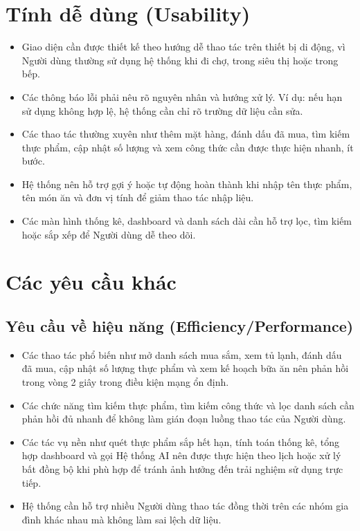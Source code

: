 \section{Tính dễ dùng (Usability)}
\begin{itemize}
    \item Giao diện cần được thiết kế theo hướng dễ thao tác trên thiết bị di động, vì Người dùng thường sử dụng hệ thống khi đi chợ, trong siêu thị hoặc trong bếp.
    \item Các thông báo lỗi phải nêu rõ nguyên nhân và hướng xử lý. Ví dụ: nếu hạn sử dụng không hợp lệ, hệ thống cần chỉ rõ trường dữ liệu cần sửa.
    \item Các thao tác thường xuyên như thêm mặt hàng, đánh dấu đã mua, tìm kiếm thực phẩm, cập nhật số lượng và xem công thức cần được thực hiện nhanh, ít bước.
    \item Hệ thống nên hỗ trợ gợi ý hoặc tự động hoàn thành khi nhập tên thực phẩm, tên món ăn và đơn vị tính để giảm thao tác nhập liệu.
    \item Các màn hình thống kê, dashboard và danh sách dài cần hỗ trợ lọc, tìm kiếm hoặc sắp xếp để Người dùng dễ theo dõi.
\end{itemize}

\section{Các yêu cầu khác}

\subsection{Yêu cầu về hiệu năng (Efficiency/Performance)}
\begin{itemize}
    \item Các thao tác phổ biến như mở danh sách mua sắm, xem tủ lạnh, đánh dấu đã mua, cập nhật số lượng thực phẩm và xem kế hoạch bữa ăn nên phản hồi trong vòng 2 giây trong điều kiện mạng ổn định.
    \item Các chức năng tìm kiếm thực phẩm, tìm kiếm công thức và lọc danh sách cần phản hồi đủ nhanh để không làm gián đoạn luồng thao tác của Người dùng.
    \item Các tác vụ nền như quét thực phẩm sắp hết hạn, tính toán thống kê, tổng hợp dashboard và gọi Hệ thống AI nên được thực hiện theo lịch hoặc xử lý bất đồng bộ khi phù hợp để tránh ảnh hưởng đến trải nghiệm sử dụng trực tiếp.
    \item Hệ thống cần hỗ trợ nhiều Người dùng thao tác đồng thời trên các nhóm gia đình khác nhau mà không làm sai lệch dữ liệu.
\end{itemize}

